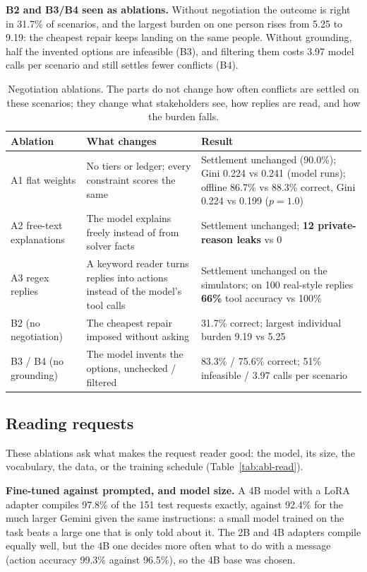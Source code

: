 \documentclass[11pt,a4paper]{article}
\newcommand{\best}[1]{\textbf{#1}}
\begin{document}
\textbf{B2 and B3/B4 seen as ablations.} Without negotiation the outcome is right in 31.7\% of scenarios, and the
largest burden on one person rises from 5.25 to 9.19: the cheapest repair keeps landing on the same people. Without
grounding, half the invented options are infeasible (B3), and filtering them costs 3.97 model calls per scenario and
still settles fewer conflicts (B4).

\begin{table}[!htb]
\centering\small
\begin{tabularx}{\textwidth}{@{}L{3.0cm} L{4.6cm} Y@{}}
\toprule
\textbf{Ablation} & \textbf{What changes} & \textbf{Result}\\
\midrule
A1 flat weights & No tiers or ledger; every constraint scores the same & Settlement unchanged (90.0\%); Gini 0.224 vs 0.241 (model runs); offline 86.7\% vs 88.3\% correct, Gini 0.224 vs 0.199 ($p=1.0$)\\
A2 free-text explanations & The model explains freely instead of from solver facts & Settlement unchanged; \best{12 private-reason leaks} vs 0\\
A3 regex replies & A keyword reader turns replies into actions instead of the model's tool calls & Settlement unchanged on the simulators; on 100 real-style replies \best{66\%} tool accuracy vs 100\%\\
B2 (no negotiation) & The cheapest repair imposed without asking & 31.7\% correct; largest individual burden 9.19 vs 5.25\\
B3 / B4 (no grounding) & The model invents the options, unchecked / filtered & 83.3\% / 75.6\% correct; 51\% infeasible / 3.97 calls per scenario\\
\bottomrule
\end{tabularx}
\caption{Negotiation ablations. The parts do not change how often conflicts are settled on these scenarios; they
change what stakeholders see, how replies are read, and how the burden falls.}
\label{tab:abl-neg}
\end{table}

\subsection{Reading requests}
These ablations ask what makes the request reader good: the model, its size, the vocabulary, the data, or the
training schedule (Table~\ref{tab:abl-read}).

\textbf{Fine-tuned against prompted, and model size.} A 4B model with a LoRA adapter compiles 97.8\% of the 151 test
requests exactly, against 92.4\% for the much larger Gemini given the same instructions: a small model trained on the
task beats a large one that is only told about it. The 2B and 4B adapters compile equally well, but the 4B one
decides more often what to do with a message (action accuracy 99.3\% against 96.5\%), so the 4B base was chosen.
\end{document}
